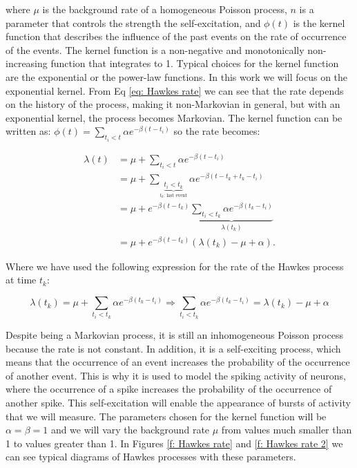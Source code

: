 where $\mu$ is the background rate of a homogeneous Poisson process, $n$ is a parameter that controls the strength the self-excitation, and $\phi(t)$ is the kernel function that
describes the influence of the past events on the rate of occurrence of the events. The kernel function is a non-negative and monotonically non-increasing function that integrates to 1.
Typical choices for the kernel function are the exponential or the power-law functions. In this work we will focus on the exponential kernel. 
From Eq \ref{eq: Hawkes rate} we can see that the rate depends on the history of the process, making it non-Markovian in general, but with an exponential kernel, the process becomes
Markovian. The kernel function can be written as: $\phi(t)=\sum_{t_i<t}\alpha e^{-\beta(t-t_i)}$ so the rate becomes:

\begin{equation}
    \begin{split}
        \lambda(t) &= \mu + \sum_{t_i<t}\alpha e^{-\beta(t-t_i)}\\
        &= \mu + \sum_{\underbrace{t_i<t_k}_{t_k\text{: last event}}}\alpha e^{-\beta(t-t_k+t_k-t_i)}\\
        &= \mu + e^{-\beta(t-t_k)}\underbrace{\sum_{t_i<t_k}\alpha e^{-\beta(t_k-t_i)}}_{\lambda(t_k)}\\
        &= \mu + e^{-\beta(t-t_k)}\left( \lambda(t_k)-\mu+\alpha \right).
    \end{split}
    \label{eq: Hawkes rate exponential becomes Markovian}
\end{equation}

Where we have used the following expression for the rate of the Hawkes process at time $t_k$:

\begin{equation}
    \lambda(t_k) =\mu+\sum_{t_i<t_k}\alpha e^{-\beta(t_k-t_i)}\Rightarrow\sum_{t_i<t_k}\alpha e^{-\beta(t_k-t_i)} = \lambda(t_k)-\mu+\alpha
    \label{eq: Hawkes rate at event time}
\end{equation}

Despite being a Markovian process, it is still an inhomogeneous Poisson process because the rate is not constant. In addition, it is a self-exciting process, which means that the occurrence
of an event increases the probability of the occurrence of another event. This is why it is used to model the spiking activity of neurons, where the occurrence of a spike increases the
probability of the occurrence of another spike. This self-excitation will enable the appearance of bursts of activity that we will measure. The parameters chosen for the kernel function 
will be $\alpha=\beta=1$ and we will vary the background rate $\mu$ from values much smaller than 1 to values greater than 1. In Figures \ref{f: Hawkes rate} and \ref{f: Hawkes rate 2}
we can see typical diagrams of Hawkes processes with these parameters.

